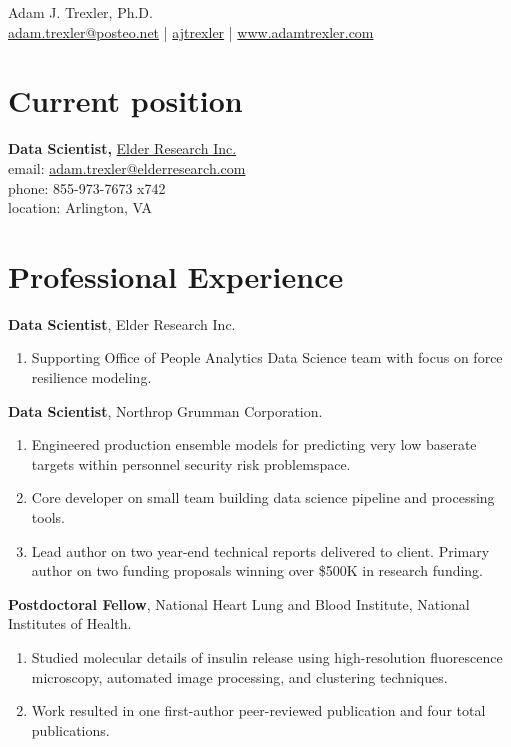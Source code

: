 \documentclass[12pt, a4paper]{article}
\newcommand{\years}[1]{\marginnote{\footnotesize #1}}
\begin{document}
\begin{center}
{\LARGE Adam J. Trexler, Ph.D.}\\[0.5cm]

\href{mailto:adam.trexler@posteo.net}{adam.trexler@posteo.net} |
\faGithub\href{https://www.github.com/ajtrexler}{ ajtrexler} |
\href{https://www.adamtrexler.com}{www.adamtrexler.com}\\[1cm] 
\end{center}
\section*{Current position}
\sffamily
\textbf{Data Scientist, }\href{www.elderresearch.com}{Elder Research Inc.}\\
email: \href{mailto:adam.trexler@elderresearch.com}{adam.trexler@elderresearch.com}\\
phone: 855-973-7673 x742\\
location: Arlington, VA\\

\section*{Professional Experience}
\noindent
\years{2018-}\textbf{Data Scientist}, Elder Research Inc.
\begin{enumerate}
\item Supporting Office of People Analytics Data Science team with focus on force resilience modeling.\\
\end{enumerate}

\years{2017-2018}\textbf{Data Scientist}, Northrop Grumman Corporation.
\begin{enumerate}
\item Engineered production ensemble models for predicting very low baserate targets within personnel security risk problemspace.
\item Core developer on small team building data science pipeline and processing tools.
\item Lead author on two year-end technical reports delivered to client.  Primary author on two funding proposals winning over \$500K in research funding.\\
\end{enumerate}

\years{2013-2017}\textbf{Postdoctoral Fellow}, National Heart Lung and Blood Institute, National Institutes of Health.
\begin{enumerate}
\item Studied molecular details of insulin release using high-resolution fluorescence microscopy, automated image processing, and clustering techniques.  
\item Work resulted in one first-author peer-reviewed publication and four total publications.\\
\end{enumerate}
\end{document}
